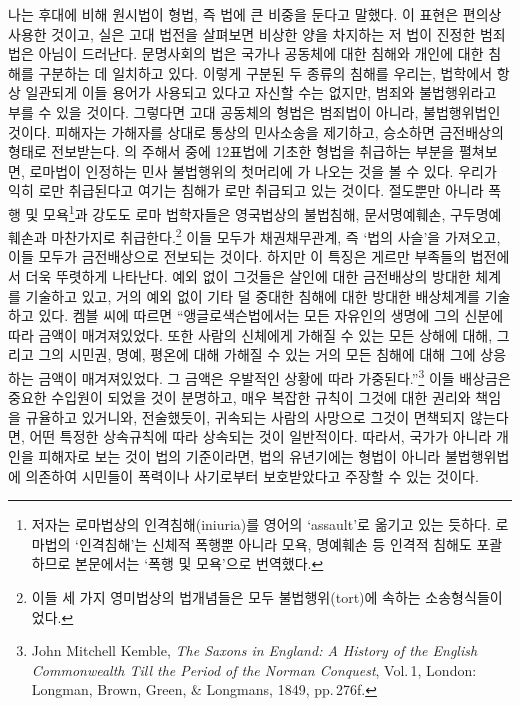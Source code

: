 나는 후대에 비해 원시법이 형법,
즉 법에
큰 비중을 둔다고 말했다.
이 표현은 편의상 사용한 것이고,
실은
고대 법전을 살펴보면
비상한 양을 차지하는 저 법이
진정한 범죄법은 아님이 드러난다.
문명사회의 법은
국가나 공동체에 대한 침해와
개인에 대한 침해를 구분하는 데 일치하고 있다.
이렇게 구분된 두 종류의 침해를 우리는,
법학에서 항상 일관되게 이들 용어가 사용되고 있다고 자신할 수는 없지만,
범죄와
불법행위라고
부를 수 있을 것이다.
그렇다면 고대 공동체의 형법은
범죄법이 아니라,
불법행위법인 것이다.
피해자는 가해자를 상대로 통상의 민사소송을 제기하고,
승소하면 금전배상의 형태로 전보받는다.
의 주해서 중에
12표법에 기초한 형법을 취급하는 부분을 펼쳐보면,
로마법이 인정하는 민사 불법행위의 첫머리에
가 나오는 것을 볼 수 있다.
우리가 익히 로만 취급된다고 여기는 침해가
로만 취급되고 있는 것이다.
절도뿐만 아니라
폭행 및 모욕\footnote{%
  저자는 로마법상의 인격침해(iniuria)를 영어의 `assault'로 옮기고 있는 듯하다.
  로마법의 `인격침해'는 신체적 폭행뿐 아니라
  모욕, 명예훼손 등 인격적 침해도
  포괄하므로 본문에서는 `폭행 및 모욕'으로 번역했다.
}과 강도도
로마 법학자들은 영국법상의 불법침해,
문서명예훼손, 구두명예훼손과
마찬가지로 취급한다.\footnote{%
  이들 세 가지 영미법상의 법개념들은 모두
  불법행위(tort)에 속하는 소송형식들이었다.}
이들 모두가 채권채무관계, 즉 `법의 사슬'을
가져오고, 이들 모두가 금전배상으로 전보되는 것이다.
하지만 이 특징은 게르만 부족들의 법전에서 더욱 뚜렷하게 나타난다.
예외 없이 그것들은
살인에 대한 금전배상의 방대한 체계를 기술하고 있고,
거의 예외 없이
기타 덜 중대한 침해에 대한 방대한 배상체계를 기술하고 있다.
켐블 씨에 따르면
``앵글로색슨법에서는 
모든 자유인의 생명에 그의 신분에 따라 금액이 매겨져있었다.
또한 사람의 신체에게 가해질 수 있는 모든 상해에 대해,
그리고 그의 시민권, 명예, 평온에 대해 가해질 수 있는 거의 모든 침해에 대해
그에 상응하는 금액이 매겨져있었다.
그 금액은 우발적인 상황에 따라 가중된다.''\footnote{%
  \latinmarks
  John Mitchell Kemble,
  \textit{The Saxons in England: A History of the English Commonwealth
  Till the Period of the Norman Conquest},
  Vol.\,1,
  London: Longman, Brown, Green, \& Longmans, 1849,
  pp.\,276f.}
이들 배상금은 중요한 수입원이 되었을 것이 분명하고,
매우 복잡한 규칙이 그것에 대한 권리와 책임을 규율하고 있거니와,
전술했듯이, 귀속되는 사람의 사망으로 그것이 면책되지 않는다면,
어떤 특정한 상속규칙에 따라 상속되는 것이 일반적이다.
따라서,
국가가 아니라 개인을 피해자로 보는 것이
법의 기준이라면,
법의 유년기에는
형법이 아니라
불법행위법에 의존하여
시민들이
폭력이나 사기로부터 보호받았다고 주장할 수 있는 것이다.

